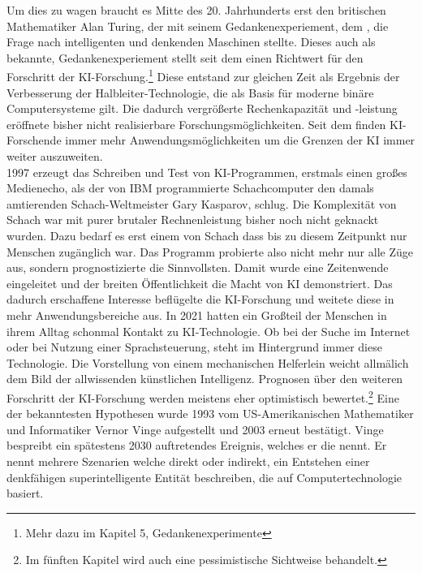 \documentclass[12pt,german,ngerman]{report}
\begin{document}
Um dies zu wagen braucht es Mitte des 20. Jahrhunderts erst den britischen Mathematiker Alan Turing, 
der mit seinem Gedankenexperiement, dem , die Frage nach intelligenten und denkenden Maschinen stellte.
Dieses auch als  bekannte, Gedankenexperiement stellt seit dem einen Richtwert für den Forschritt der KI-Forschung.\footnote{Mehr dazu im Kapitel 5, Gedankenexperimente}
Diese entstand zur gleichen Zeit als Ergebnis der Verbesserung der Halbleiter-Technologie, die als Basis für 
moderne binäre Computersysteme gilt. Die dadurch vergrößerte Rechenkapazität und -leistung eröffnete bisher nicht realisierbare Forschungsmöglichkeiten. 
Seit dem finden KI-Forschende immer mehr Anwendungsmöglichkeiten um die Grenzen der KI immer weiter auszuweiten.\\

1997 erzeugt das Schreiben und Test von KI-Programmen, erstmals einen großes Medienecho, als der von IBM programmierte Schachcomputer
 den damals amtierenden Schach-Weltmeister Gary Kasparov, schlug.\cite{chessbase2017kasparovdeepblue} Die Komplexität von Schach war mit purer brutaler
Rechnenleistung bisher noch nicht geknackt wurden. Dazu bedarf es erst einem  von Schach dass bis zu diesem
Zeitpunkt nur Menschen zugänglich war. Das Programm probierte also nicht mehr nur alle Züge aus, sondern prognostizierte die 
Sinnvollsten. Damit wurde eine Zeitenwende eingeleitet und der breiten Öffentlichkeit die Macht von KI demonstriert.
Das dadurch erschaffene Interesse beflügelte die KI-Forschung und weitete diese in mehr Anwendungsbereiche aus.
In 2021 hatten ein Großteil der Menschen in ihrem Alltag schonmal Kontakt zu KI-Technologie. 
Ob bei der Suche im Internet oder bei Nutzung einer Sprachsteuerung, steht im Hintergrund immer diese Technologie.
Die Vorstellung von einem mechanischen Helferlein weicht allmälich dem Bild der allwissenden künstlichen Intelligenz.
Prognosen über den weiteren Forschritt der KI-Forschung werden meistens eher optimistisch bewertet.\footnote{Im fünften Kapitel wird auch eine pessimistische Sichtweise behandelt.} 
Eine der bekanntesten Hypothesen wurde 1993 vom US-Amerikanischen Mathematiker und Informatiker Vernor Vinge aufgestellt und 2003
erneut bestätigt. Vinge bespreibt ein spätestens 2030 auftretendes Ereignis, 
welches er die \cite[1]{vinge1993technological} nennt. 
Er nennt mehrere Szenarien welche direkt oder indirekt, ein Entstehen einer denkfähigen superintelligente Entität beschreiben, 
die auf Computertechnologie basiert.\\
\end{document}
